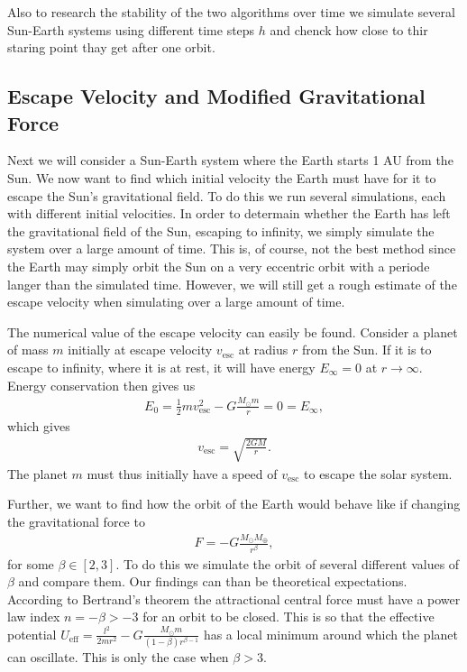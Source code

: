 \documentclass[twocolumn]{aastex62}
\begin{document}
Also to research the stability of the two algorithms over
time we simulate several Sun-Earth systems using different time steps $h$ and
chenck how close to thir staring point thay get after one orbit. 

\subsection{Escape Velocity and Modified Gravitational Force}\label{sec:modgrav}
Next we will consider a Sun-Earth system where the Earth starts 1 AU from the
Sun. We now want to find which initial velocity the Earth must have for it to
escape the Sun's gravitational field. To do this we run several simulations,
each with different initial velocities. In order to determain whether the Earth
has left the gravitational field of the Sun, escaping to infinity, we simply
simulate the system over a large amount of time. This is, of course, not the
best method since the Earth may simply orbit the Sun on a very eccentric orbit
with a periode langer than the simulated time. However, we will still get a
rough estimate of the escape velocity when simulating over a large amount of time.

The numerical value of the escape velocity can easily be found. Consider a
planet of mass $m$ initially at escape velocity $v_\mathrm{esc}$ at radius $r$
from the Sun. If it is to escape to infinity, where it is at rest, it will have
energy $E_\infty = 0$ at $r\to\infty$. Energy conservation then gives us 
\begin{align}
    E_0 = \frac{1}{2}mv_\mathrm{esc}^2 - G\frac{M_\odot m}{r} = 0 = E_\infty,
\end{align} 
which gives 
\begin{align}\label{eq:v_esc}
    v_\mathrm{esc} = \sqrt{\frac{2GM}{r}}.
\end{align}
The planet $m$ must thus initially have a speed of $v_\mathrm{esc}$ to escape the solar system.

Further, we want to find how the orbit of the Earth would behave like if
changing the gravitational force to 
\begin{align}
    F = -G\frac{M_\odot M_\oplus}{r^\beta},
\end{align}
for some $\beta\in[2, 3]$. To do this we simulate the orbit of several different
values of $\beta$ and compare them. Our findings can than be theoretical
expectations. According to Bertrand's theorem \citep[ch. 3.6]{goldstein:2001} the attractional central
force must have a power law index $n = -\beta > -3$ for an orbit to be closed. This is so
that the effective potential $U_\mathrm{eff} = \frac{l^2}{2mr^2} -
G\frac{M_\odot m}{(1-\beta)r^{\beta - 1}}$ has a local minimum around which the
planet can oscillate. This is only the case when $\beta > 3$.
\end{document}
